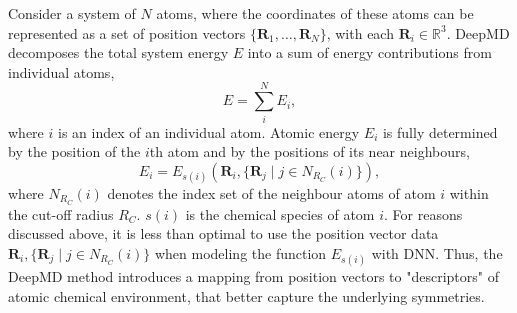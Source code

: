 Consider a system of $N$ atoms, where the coordinates of these atoms can be
represented as a set of position vectors
$\{\mathbf{R}_1, \dots, \mathbf{R}_N\}$, with each
$\mathbf{R}_i \in \mathbb{R}^3$. DeepMD decomposes the total system energy $E$
into a sum of energy contributions from individual atoms,
\begin{equation}
  E = \sum_i^N E_i,
\end{equation}
where $i$ is an index of an individual atom. Atomic energy $E_i$ is fully
determined by the position of the $i$th atom and by the positions of its near
neighbours,
\begin{equation}
  E_i = E_{s(i)}(\mathbf{R}_i, \{\mathbf{R}_j \mid j \in  N_{R_C}(i)\}),
\end{equation}
where $N_{R_C}(i)$ denotes the index set of the neighbour atoms of atom $i$
within the cut-off radius $R_C$. $s(i)$ is the chemical species of atom $i$.
For reasons discussed above, it is less than optimal to use the position
vector data $\mathbf{R}_i, \{\mathbf{R}_j \mid j \in  N_{R_C}(i)\}$ when
modeling the function $E_{s(i)}$ with DNN. Thus, the DeepMD method introduces
a mapping from position vectors to "descriptors" of atomic chemical
environment, that better capture the underlying symmetries.

